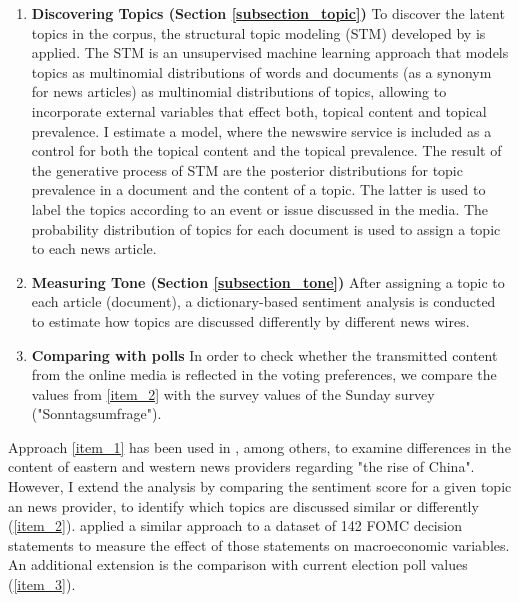 \documentclass[12pt,a4paper,notitlepage]{article}
\begin{document}
\begin{enumerate}
	\item\label{item_1} \textbf{Discovering Topics (Section \ref{subsection_topic})} To discover the latent topics in the corpus, the structural topic modeling (STM) developed by \citet{roberts_model_2016} is applied. The STM is an unsupervised machine learning approach that models topics as multinomial distributions of words and documents (as a synonym for news articles) as multinomial distributions of topics, allowing to incorporate external variables that effect both, topical content and topical prevalence. I estimate a model, where the newswire service is included as a control for both the topical content and the topical prevalence. The result of the generative process of STM are the posterior distributions for topic prevalence in a document and the content of a topic. The latter is used to label the topics according to an event or issue discussed in the media. The probability distribution of topics for each document is used to assign a topic to each news article. 
	\item\label{item_2} \textbf{Measuring Tone (Section \ref{subsection_tone})} After assigning a topic to each article (document), a dictionary-based sentiment analysis is conducted to estimate how topics are discussed differently by different news wires.
	\item\label{item_3} \textbf{Comparing with polls} In order to check whether the transmitted content from the online media is reflected in the voting preferences, we compare the values from \ref{item_2} with the survey values of the Sunday survey ("Sonntagsumfrage").


\end{enumerate}

Approach \ref{item_1} has been used in \citet{roberts_model_2016}, among others, to examine differences in the content of eastern and western news providers regarding "the rise of China". However, I extend the analysis by comparing the sentiment score for a given topic an news provider, to identify which topics are discussed similar or differently (\ref{item_2}). \citet{hansen_shocking_2016} applied a similar approach to a dataset of 142 FOMC decision statements to measure the effect of those statements on macroeconomic variables. An additional extension is the comparison with current election poll values (\ref{item_3}). 
\end{document}
